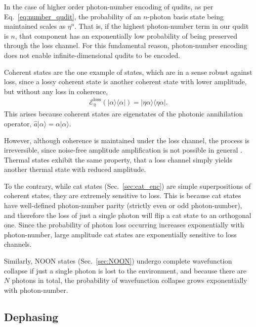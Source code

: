 \documentclass[aps,rmp,twocolumn,amsmath,amssymb,nofootinbib,superscriptaddress,longbibliography,floatfix]{revtex4-1}
\newcommand{\bra}[1]{\langle#1|}
\newcommand{\ket}[1]{|#1\rangle}
\begin{document}
In the case of higher order photon-number encoding of qudits, as per Eq.~\ref{eq:number_qudit}, the probability of an $n$-photon basis state being maintained scales as $\eta^n$. That is, if the highest photon-number term in our qudit is $n$, that component has an exponentially low probability of being preserved through the loss channel. For this fundamental reason, photon-number encoding does not enable infinite-dimensional qudits to be encoded.

Coherent states are the one example of states, which are in a sense robust against loss, since a lossy coherent state is another coherent state with lower amplitude, but without any loss in coherence,
\begin{align}
\mathcal{E}^\mathrm{loss}_\eta(\ket\alpha\bra\alpha) = \ket{\eta\alpha}\bra{\eta\alpha}.
\end{align}
This arises because coherent states are eigenstates of the photonic annihilation operator, \mbox{$\hat{a}\ket{\alpha}=\alpha\ket{\alpha}$}.

However, although coherence is maintained under the loss channel, the process is irreversible, since noise-free amplitude amplification is not possible in general \cite{???}. Thermal states exhibit the same property, that a loss channel simply yields another thermal state with reduced amplitude.

To the contrary, while cat states (Sec.~\ref{sec:cat_enc}) are simple superpositions of coherent states, they are extremely sensitive to loss. This is because cat states have well-defined photon-number parity (strictly even or odd photon-number), and therefore the loss of just a single photon will flip a cat state to an orthogonal one. Since the probability of photon loss occurring increases exponentially with photon-number, large amplitude cat states are exponentially sensitive to loss channels.

Similarly, NOON states (Sec.~\ref{sec:NOON}) undergo complete wavefunction collapse if just a single photon is lost to the environment, and because there are $N$ photons in total, the probability of wavefunction collapse grows exponentially with photon-number.

%
%

\subsection{Dephasing} \label{sec:dephasing_error}
\end{document}
